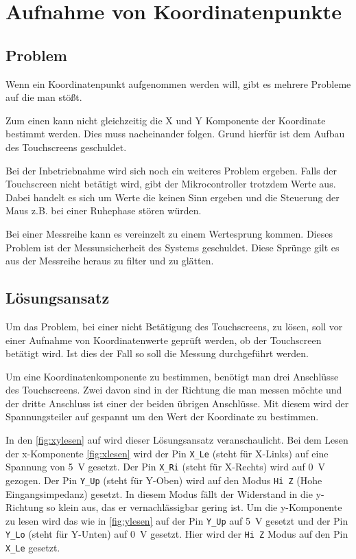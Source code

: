 \chapter{Aufnahme von Koordinatenpunkte}
\section{Problem}
Wenn ein Koordinatenpunkt aufgenommen werden will, gibt es mehrere Probleme auf die man stößt.

Zum einen kann nicht gleichzeitig die X und Y Komponente der Koordinate bestimmt werden. Dies muss nacheinander folgen.
Grund hierfür ist dem Aufbau des Touchscreens geschuldet.

Bei der Inbetriebnahme wird sich noch ein weiteres Problem ergeben.
Falls der Touchscreen nicht betätigt wird, gibt der Mikrocontroller trotzdem Werte aus.
Dabei handelt es sich um Werte die keinen Sinn ergeben und die Steuerung der Maus z.B. bei einer Ruhephase stören würden.

Bei einer Messreihe kann es vereinzelt zu einem Wertesprung kommen. 
Dieses Problem ist der Messunsicherheit des Systems geschuldet. 
Diese Sprünge gilt es aus der Messreihe heraus zu filter und zu glätten.

\section{Lösungsansatz}
Um das Problem, bei einer nicht Betätigung des Touchscreens, zu lösen, soll vor einer Aufnahme von Koordinatenwerte geprüft werden, ob der Touchscreen betätigt wird.
Ist dies der Fall so soll die Messung durchgeführt werden.

Um eine Koordinatenkomponente zu bestimmen, benötigt man drei Anschlüsse des Touchscreens.
Zwei davon sind in der Richtung die man messen möchte und der dritte Anschluss ist einer der beiden übrigen Anschlüsse.
Mit diesem wird der Spannungsteiler auf gespannt um den Wert der Koordinate zu bestimmen.

In den \cref{fig:xylesen} auf  wird dieser Lösungsansatz veranschaulicht.
Bei dem Lesen der x-Komponente \cref{fig:xlesen} wird der Pin \verb$X_Le$ (steht für X-Links) auf eine Spannung von \SI{5}{V} gesetzt.
Der Pin \verb$X_Ri$ (steht für X-Rechts) wird auf \SI{0}{V} gezogen.
Der Pin  \verb$Y_Up$ (steht für Y-Oben) wird auf den Modus \verb$Hi Z$ (Hohe Eingangsimpedanz) gesetzt. In diesem Modus fällt der Widerstand in die y-Richtung so klein aus, das er vernachlässigbar gering ist.
Um die y-Komponente zu lesen wird das wie in \cref{fig:ylesen} auf  der Pin \verb$Y_Up$ auf \SI{5}{V} gesetzt und der Pin \verb$Y_Lo$ (steht für Y-Unten) auf \SI{0}{V} gesetzt.
Hier wird der \verb$Hi Z$ Modus auf den Pin \verb$X_Le$ gesetzt.

